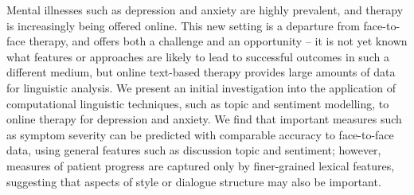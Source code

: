 Mental illnesses such as depression and anxiety are highly prevalent, and therapy is increasingly being offered online.  This new setting is a departure from face-to-face therapy, and offers both a challenge and an opportunity -- it is not yet known what features or approaches are likely to lead to successful outcomes in such a different medium, but online text-based therapy provides large amounts of data for linguistic analysis.  We present an initial investigation into the application of computational linguistic techniques, such as topic and sentiment modelling, to online therapy for depression and anxiety. We find that important measures such as symptom severity can be predicted with comparable accuracy to face-to-face data, using general features such as discussion topic and sentiment; however, measures of patient progress are captured only by finer-grained lexical features, suggesting that aspects of style or dialogue structure may also be important.
